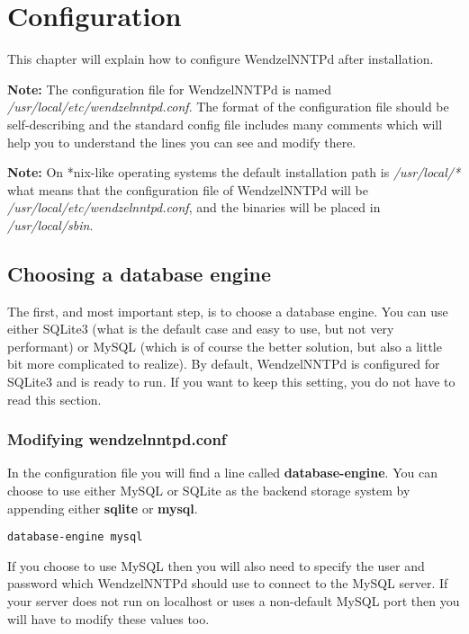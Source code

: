 \chapter{Configuration}

This chapter will explain how to configure WendzelNNTPd after installation.

{\bf Note:} The configuration file for WendzelNNTPd is named {\it /usr/local/etc/wendzelnntpd.conf}. The format of the configuration file should be self-describing and the standard config file includes many comments which will help you to understand the lines you can see and modify there.

{\bf Note:} On *nix-like operating systems the default installation path is {\it /usr/local/*} what means that the configuration file of WendzelNNTPd will be {\it /usr/local/etc/wendzelnntpd.conf}, and the binaries will be placed in {\it /usr/local/sbin}. %

\section{Choosing a database engine}

The first, and most important step, is to choose a database engine. You can use either SQLite3 (what is the default case and easy to use, but not very performant) or MySQL (which is of course the better solution, but also a little bit more complicated to realize). By default, WendzelNNTPd is configured for SQLite3 and is ready to run. If you want to keep this setting, you do not have to read this section.

\subsection{Modifying wendzelnntpd.conf}

In the configuration file you will find a line called {\bf database-engine}. You can choose to use either MySQL or SQLite as the backend storage system by appending either {\bf sqlite} or {\bf mysql}.

\begin{verbatim}
database-engine mysql
\end{verbatim}

If you choose to use MySQL then you will also need to specify the user and password which WendzelNNTPd should use to connect to the MySQL server. If your server does not run on localhost or uses a non-default MySQL port then you will have to modify these values too.

